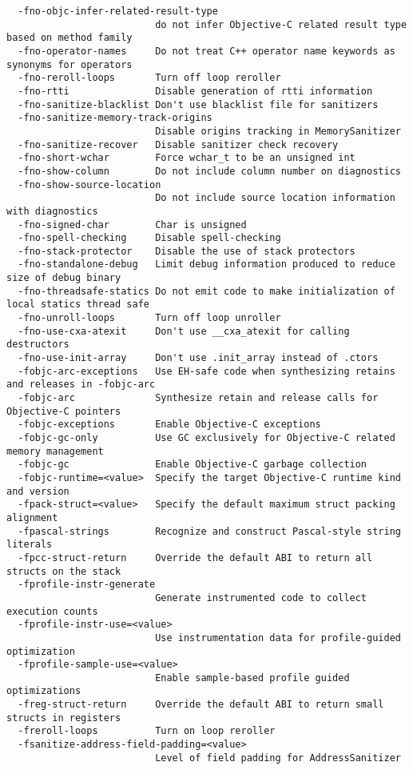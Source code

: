 \begin{verbatim}
  -fno-objc-infer-related-result-type
                          do not infer Objective-C related result type based on method family
  -fno-operator-names     Do not treat C++ operator name keywords as synonyms for operators
  -fno-reroll-loops       Turn off loop reroller
  -fno-rtti               Disable generation of rtti information
  -fno-sanitize-blacklist Don't use blacklist file for sanitizers
  -fno-sanitize-memory-track-origins
                          Disable origins tracking in MemorySanitizer
  -fno-sanitize-recover   Disable sanitizer check recovery
  -fno-short-wchar        Force wchar_t to be an unsigned int
  -fno-show-column        Do not include column number on diagnostics
  -fno-show-source-location
                          Do not include source location information with diagnostics
  -fno-signed-char        Char is unsigned
  -fno-spell-checking     Disable spell-checking
  -fno-stack-protector    Disable the use of stack protectors
  -fno-standalone-debug   Limit debug information produced to reduce size of debug binary
  -fno-threadsafe-statics Do not emit code to make initialization of local statics thread safe
  -fno-unroll-loops       Turn off loop unroller
  -fno-use-cxa-atexit     Don't use __cxa_atexit for calling destructors
  -fno-use-init-array     Don't use .init_array instead of .ctors
  -fobjc-arc-exceptions   Use EH-safe code when synthesizing retains and releases in -fobjc-arc
  -fobjc-arc              Synthesize retain and release calls for Objective-C pointers
  -fobjc-exceptions       Enable Objective-C exceptions
  -fobjc-gc-only          Use GC exclusively for Objective-C related memory management
  -fobjc-gc               Enable Objective-C garbage collection
  -fobjc-runtime=<value>  Specify the target Objective-C runtime kind and version
  -fpack-struct=<value>   Specify the default maximum struct packing alignment
  -fpascal-strings        Recognize and construct Pascal-style string literals
  -fpcc-struct-return     Override the default ABI to return all structs on the stack
  -fprofile-instr-generate
                          Generate instrumented code to collect execution counts
  -fprofile-instr-use=<value>
                          Use instrumentation data for profile-guided optimization
  -fprofile-sample-use=<value>
                          Enable sample-based profile guided optimizations
  -freg-struct-return     Override the default ABI to return small structs in registers
  -freroll-loops          Turn on loop reroller
  -fsanitize-address-field-padding=<value>
                          Level of field padding for AddressSanitizer

\end{verbatim}

